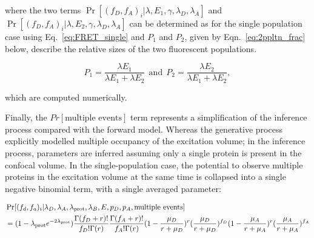  

where the two terms $\Pr[(f_D, f_A)_i | \lambda, E_1, \gamma, \lambda_{D}, \lambda_{A}]$ and $\Pr[(f_D, f_A)_i | \lambda, E_2, \gamma, \lambda_{D}, \lambda_{A}]$ can be determined as for the single population case using Eq.~\ref{eq:FRET_single} and $P_1$ and $P_2$, given by Eqn.~\ref{eq:2ppltn_frac} below, describe the relative sizes of the two fluorescent populations.

\begin{equation}
P_1 = \frac{\lambda E_1}{\lambda E_1 + \lambda E_2}~~\text{and}~~P_2 = \frac{\lambda E_2}{\lambda E_1 + \lambda E_2},
\label{eq:2ppltn_frac}
\end{equation}

which are computed numerically.  

Finally, the $Pr[\text{multiple events}]$ term represents a simplification of the inference process compared with the forward model.  Whereas the generative process explicitly modelled  multiple occupancy of the excitation volume; in the inference process, parameters are inferred assuming only a single protein is present in the confocal volume.  In the single-population case, the potential to observe multiple proteins in the excitation volume at the same time is collapsed into a single negative binomial term, with a single averaged parameter:

\begin{equation}
\begin{aligned}
\footnotesize
&\Pr[(f_d, f_a)_i|\lambda_D, \lambda_A, \lambda_{\text{prot}}, \lambda_B, E, p_D, p_A, \text{multiple events}] \\ 
&= (1-\lambda_{\text{prot}} e^{-2\lambda_{\text{prot}}})\frac{\Gamma(f_D+r)!}{f_D!\Gamma(r)}\frac{\Gamma(f_A+r)!}{f_A!\Gamma(r)}(1-\frac{\mu_D}{r+\mu_D})^r(\frac{\mu_D}{r+\mu_D})^{f_D}(1-\frac{\mu_A}{r+\mu_A})^r(\frac{\mu_A}{r+\mu_A})^{f_A}
\label{eq:multippltn} 
\end{aligned}
\end{equation}


